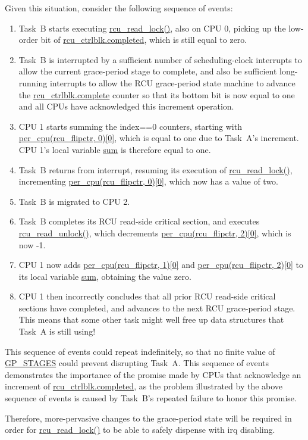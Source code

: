Given this situation, consider the following sequence of events:
\begin{enumerate}
\item	Task~B starts executing \url{rcu_read_lock()}, also on
	CPU 0, picking up the low-order bit of
	\url{rcu_ctrlblk.completed}, which is still equal to zero.
\item	Task~B is interrupted by a sufficient number of scheduling-clock
	interrupts to allow the current grace-period stage to complete,
	and also be sufficient long-running interrupts to allow the
	RCU grace-period state machine to advance the
	\url{rcu_ctrlblk.complete} counter so that its bottom bit
	is now equal to one and all CPUs have acknowledged this increment
	operation.
\item	CPU 1 starts summing the index==0 counters, starting with
	\url{per_cpu(rcu_flipctr, 0)[0]}, which is equal to one
	due to Task~A's increment.
	CPU 1's local variable \url{sum} is therefore equal to one.
\item	Task~B returns from interrupt, resuming its execution of
	\url{rcu_read_lock()}, incrementing
	\url{per_cpu(rcu_flipctr, 0)[0]}, which now has a value
	of two.
\item	Task~B is migrated to CPU 2.
\item	Task~B completes its RCU read-side critical section, and executes
	\url{rcu_read_unlock()}, which decrements
	\url{per_cpu(rcu_flipctr, 2)[0]}, which is now -1.
\item	CPU 1 now adds \url{per_cpu(rcu_flipctr, 1)[0]} and 
	\url{per_cpu(rcu_flipctr, 2)[0]} to its
	local variable \url{sum}, obtaining the value zero.
\item	CPU 1 then incorrectly concludes that all prior RCU read-side
	critical sections have completed, and advances to the next
	RCU grace-period stage.
	This means that some other task might well free up data structures
	that Task~A is still using!
\end{enumerate}

This sequence of events could repeat indefinitely, so that no finite
value of \url{GP_STAGES} could prevent disrupting Task~A.
This sequence of events demonstrates the importance of the promise
made by CPUs that acknowledge an increment of
\url{rcu_ctrlblk.completed}, as the problem illustrated by the
above sequence of events is caused by Task~B's repeated failure
to honor this promise.

Therefore, more-pervasive changes to the grace-period state will be
required in order for \url{rcu_read_lock()} to be able to safely
dispense with irq disabling.

